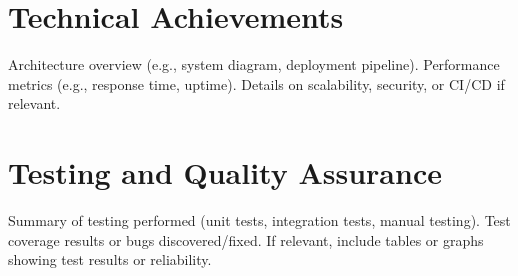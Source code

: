 \section{Technical Achievements}
Architecture overview (e.g., system diagram, deployment pipeline). Performance metrics (e.g., response time, uptime). Details on scalability, security, or CI/CD if relevant. 

\section{Testing and Quality Assurance}
Summary of testing performed (unit tests, integration tests, manual testing). Test coverage results or bugs discovered/fixed. If relevant, include tables or graphs showing test results or reliability.